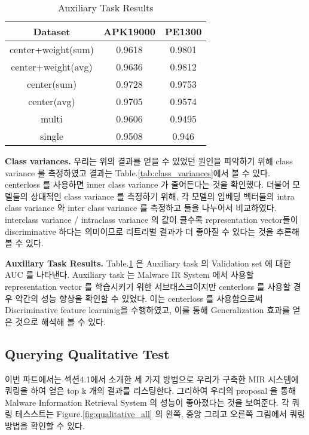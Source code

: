 \begin{table}[!htb]%
\caption{Auxiliary Task Results}
\label{tab:auxiliary_result}
\begin{minipage}{\columnwidth}
\begin{center}
\begin{tabular}{|c|c|c|}
\hline
Dataset             & APK19000 & PE1300 \\ \hline
center+weight(sum)  & 0.9618   & 0.9801 \\ \hline
center+weight(avg) & 0.9636   & 0.9812 \\ \hline
center(sum)         & 0.9728   & 0.9753 \\ \hline
center(avg)        & 0.9705   & 0.9574 \\ \hline
multi               & 0.9606   & 0.9495 \\ \hline
single              & 0.9508   & 0.946  \\ \hline
\end{tabular}
\end{center}
\bigskip\centering
\end{minipage}
\end{table}%

\textbf{Class variances. }
우리는 위의 결과를 얻을 수 있었던 원인을 파악하기 위해 class variance 를 측정하였고 결과는 Table.\ref{tab:class_variances}에서 볼 수 있다. centerloss 를 사용하면 inner class variance 가 줄어든다는 것을 확인했다. 더불어 모델들의 상대적인 class variance 를 측정하기 위해, 각 모델의 임베딩 벡터들의 intra class variance 와 inter class variance 를 측정하고 둘을 나누어서 비교하였다. interclass variance / intraclass variance 의 값이 클수록 representation vector들이 discriminative 하다는 의미이므로 리트리벌 결과가 더 좋아질 수 있다는 것을 추론해볼 수 있다. 

\textbf{Auxiliary Task Results. }
Table.\ref{tab:auxiliary_result} 은 Auxiliary task 의 Validation set 에 대한 AUC 를 나타낸다. Auxiliary task 는 Malware IR System 에서 사용할 representation vector 를 학습시키기 위한 서브태스크이지만 centerloss 를 사용할 경우 약간의 성능 향상을 확인할 수 있었다. 이는 centerloss 를 사용함으로써 Discriminative feature learninig\cite{wen2016discriminative}을 수행하였고, 이를 통해 Generalization 효과를 얻은 것으로 해석해 볼 수 있다.


\subsection{Querying Qualitative Test}
이번 파트에서는 섹션4.1에서 소개한 세 가지 방법으로 우리가 구축한 MIR 시스템에 쿼링을 하여 얻은 top k 개의 결과를 리스팅한다. 그리하여 우리의 proposal 을 통해 Malware Information Retrieval System 의 성능이 좋아졌다는 것을 보여준다. 각 쿼링 테스스트는 Figure.\ref{fig:qualitative_all} 의 왼쪽, 중앙 그리고 오른쪽 그림에서 쿼링 방법을 확인할 수 있다.

